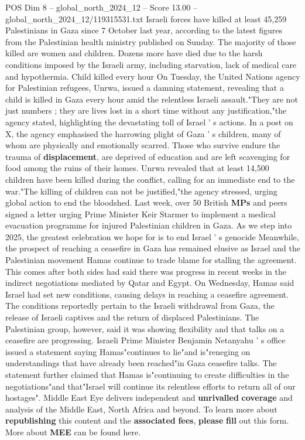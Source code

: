 \begin{textsample}{POS Dim 8 – global\_north\_2024\_12 – Score 13.00 – global\_north\_2024\_12/119315531.txt}
Israeli forces have killed at least 45,259 Palestinians in Gaza since 7 October last year, according to the latest figures from the Palestinian health ministry published on Sunday.
The majority of those killed are women and children.
Dozens more have died due to the harsh conditions imposed by the Israeli army, including starvation, lack of medical care and hypothermia.
Child killed every hour On Tuesday, the United Nations agency for Palestinian refugees, Unrwa, issued a damning statement, revealing that a child is killed in Gaza every hour amid the relentless Israeli assault."They are not just numbers ; they are lives lost in a short time without any justification,"the agency stated, highlighting the devastating toll of Israel ' s actions.
In a post on X, the agency emphasised the harrowing plight of Gaza ' s children, many of whom are physically and emotionally scarred.
Those who survive endure the trauma of \textbf{displacement}, are deprived of education and are left scavenging for food among the ruins of their homes.
Unrwa revealed that at least 14,500 children have been killed during the conflict, calling for an immediate end to the war."The killing of children can not be justified,"the agency stressed, urging global action to end the bloodshed.
Last week, over 50 British \textbf{MPs} and peers signed a letter urging Prime Minister Keir Starmer to implement a medical evacuation programme for injured Palestinian children in Gaza.
As we step into 2025, the greatest celebration we hope for is to end Israel ' s genocide Meanwhile, the prospect of reaching a ceasefire in Gaza has remained elusive as Israel and the Palestinian movement Hamas continue to trade blame for stalling the agreement.
This comes after both sides had said there was progress in recent weeks in the indirect negotiations mediated by Qatar and Egypt.
On Wednesday, Hamas said Israel had set new conditions, causing delays in reaching a ceasefire agreement.
The conditions reportedly pertain to the Israeli withdrawal from Gaza, the release of Israeli captives and the return of displaced Palestinians.
The Palestinian group, however, said it was showing flexibility and that talks on a ceasefire are progressing.
Israeli Prime Minister Benjamin Netanyahu ' s office issued a statement saying Hamas"continues to lie"and is"reneging on understandings that have already been reached"in Gaza ceasefire talks.
The statement further claimed that Hamas is"continuing to create difficulties in the negotiations"and that"Israel will continue its relentless efforts to return all of our hostages".
Middle East Eye delivers independent and \textbf{unrivalled} \textbf{coverage} and analysis of the Middle East, North Africa and beyond.
To learn more about \textbf{republishing} this content and the \textbf{associated} \textbf{fees}, \textbf{please} \textbf{fill} out this form.
More about \textbf{MEE} can be found here.

\end{textsample}
